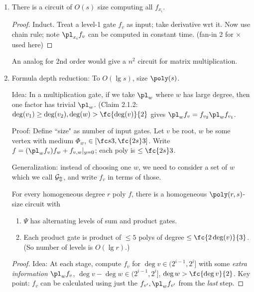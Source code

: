 \begin{enumerate}
\begin{proof}
Each $+$ is connected to all previous $\times$'s with gadgets that can turn them on or off. For $\times$, similar (but have to make a log-depth tree of $\times$ to make fan-in still 2, this affects size by a constant factor). This gives factor of $r^2$.
\end{proof}
\item
\begin{thm}
There is a circuit of $O(s)$ size computing all $f_{x_i}$.
\end{thm}
\begin{proof}
Induct. Treat a level-1 gate $f_v$ as input; take derivative wrt it. Now use chain rule; note $\pl_{x_i}f_v$ can be computed in constant time. (fan-in 2 for $\times$ used here)
\end{proof}
An analog for 2nd order would give a $n^2$ circuit for matrix multiplication.
\item
Formula depth reduction: To $O(\lg s)$, size $\poly(s)$.

Idea: In a multiplication gate, if we take $\pl_w$ where $w$ has large degree, then one factor has trivial $\pl_w$. (Claim 2.1.2: $\deg(v_1)\ge \deg(v_2),\deg(w)>\fc{\deg(v)}{2}$ gives $\pl_wf_v=f_{v_2}\pl_wf_{v_1}$.

Proof: Define ``size" as number of input gates. Let $v$ be root, $w$ be some vertex with medium $\Phi_w$, $\in [\fc s3,\fc{2s}3]$. Write $f=(\pl_w f_v)f_w+f_{v,w}|_{y=0}$; each poly is $\le \fc{2s}3$. 

Generalization: instead of choosing one $w$, we need to consider a set of $w$ which we call $\cal G_m$, and write $f_v$ in terms of those.

\begin{thm}
For every homogeneous degree $r$ poly $f$, there is a homogeneous $\poly(r,s)$-size circuit with
\begin{enumerate}
\item
$\Psi$ has alternating levels of sum and product gates.
\item 
Each product gate is product of $\le 5$ polys of degree $\le \fc{2\deg(v)}{3}$. (So number of levels is $O(\lg r)$.)
\end{enumerate}
\end{thm}
\begin{proof}
Idea: At each stage, compute $f_v$ for $\deg v\in (2^{i-1},2^i]$ with some {\it extra information} $\pl_wf_v$, $\deg v - \deg w\in (2^{i-1},2^i]$, $\deg w>\fc{\deg v}{2}$. Key point: $f_v$ can be calculated using just the $f_{v'},\pl_wf_{v'}$ from the {\it last} step.


\end{proof}
\end{enumerate}
